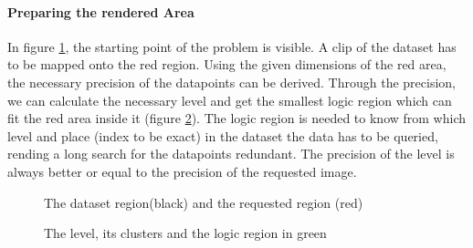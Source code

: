 \documentclass[10pt,a4paper,titlepage]{article}
\begin{document}
	\paragraph{Preparing the rendered Area}
	In figure \ref{fig:region_over_dataset}, the starting point of the problem is visible. A clip of the dataset has to be mapped onto the red region. Using the given dimensions of the red area, the necessary precision of the datapoints can be derived. Through the precision, we can calculate the necessary level and get the smallest logic region which can fit the red area inside it (figure \ref{fig:logic_region_over_dataset}). The logic region is needed to know from which level and place (index to be exact) in the dataset the data has to be queried, rending a long search for the datapoints redundant. The precision of the level is always better or equal to the precision of the requested image.	
	\begin{figure}
	\centering
	\caption{The dataset region(black) and the requested region (red)}
	\label{fig:region_over_dataset}
	\end{figure}
	
	\begin{figure}
		\centering
		\caption{The level, its clusters and the logic region in green}
		\label{fig:logic_region_over_dataset}
	\end{figure}
\end{document}
